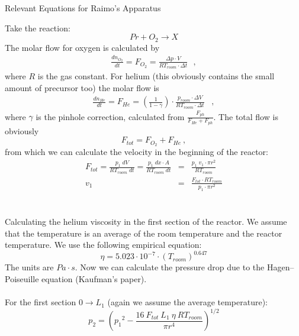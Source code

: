 \documentclass[10pt, a4paper]{article}
\begin{document}
\begin{center}
\begin{huge}
Relevant Equations for Raimo's Apparatus
\end{huge}
\end{center}
Take the reaction: 
\begin{equation*}
Pr + O_2 \rightarrow X
\end{equation*}
The molar flow for oxygen is calculated by 
\begin{eqnarray*}
\frac{dn_{O_2}}{dt} = F_{O_2} = \frac{\Delta p \cdot V}{RT_{room} \cdot \Delta t} \:\:\:, 
\end{eqnarray*}
where $R$ is the gas constant. For helium (this obviously contains the small amount of precursor too) the molar flow is 
\begin{eqnarray*}
\frac{dn_{He}}{dt} = F_{He} = \left( \frac{1}{1 - \gamma} \right) \cdot \frac{p_{room} \cdot \Delta V}{RT_{room} \cdot \Delta t} \;\;\;,
\end{eqnarray*}
where $\gamma$ is the pinhole correction, calculated from $ \frac{F_{ph}}{F_{He} + F_{ph}} $. The total flow is obviously 
\begin{equation*}
F_{tot} = F_{O_2} + F_{He} \:, 
\end{equation*}
from which we can calculate the velocity in the beginning of the reactor: 
\begin{eqnarray*}
F_{tot} = \frac{p_1\;dV}{RT_{room}\;dt} = \frac{p_1\; dx \cdot A}{RT_{room}\;dt} &=& \frac{p_1\; v_1 \cdot \pi r^2}{RT_{room}} \\
v_1 &=& \frac{F_{tot} \cdot RT_{room}}{p_1 \cdot \pi r^2}
\end{eqnarray*}
\\
\\
Calculating the helium viscosity in the first section of the reactor. We assume that the temperature is an average of the room temperature and the reactor temperature. We use the following empirical equation: 
\begin{equation*}
\eta = 5.023\cdot 10^{-7} \cdot \left( T_{room} \right)^{0.647} 
\end{equation*}
The units are $Pa \cdot s$. Now we can calculate the pressure drop due to the Hagen–Poiseuille equation (Kaufman's paper). 
\\
\\
For the first section $0 \rightarrow L_1$ (again we assume the average temperature): 
\begin{equation*}
p_2 = \left( {p_1}^2 - \frac{16\:F_{tot} \: L_1 \: \eta \: RT_{room}}{\pi r^4} \right)^{1/2}
\end{equation*}
\end{document}
